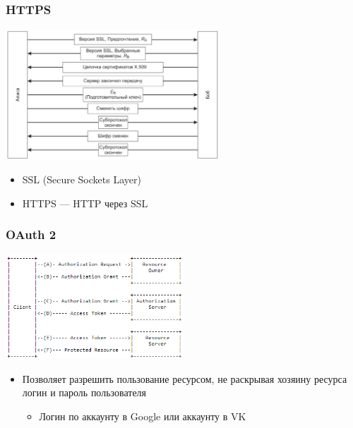 \documentclass{../../slides-style}
\begin{document}
    \begin{frame}
        \frametitle{HTTPS}
        \begin{center}
            \includegraphics[width=0.6\textwidth]{ssl.png}
        \end{center}
        \begin{itemize}
            \item SSL (Secure Sockets Layer)
            \item HTTPS --- HTTP через SSL
        \end{itemize}
    \end{frame}

    \begin{frame}
        \frametitle{OAuth 2}
        \begin{center}
            \includegraphics[width=0.5\textwidth]{oauth.png}
        \end{center}
        \begin{itemize}
            \item Позволяет разрешить пользование ресурсом, не раскрывая хозяину ресурса логин и пароль пользователя
            \begin{itemize}
                \item Логин по аккаунту в Google или аккаунту в VK
            \end{itemize}
        \end{itemize}
    \end{frame}
\end{document}

